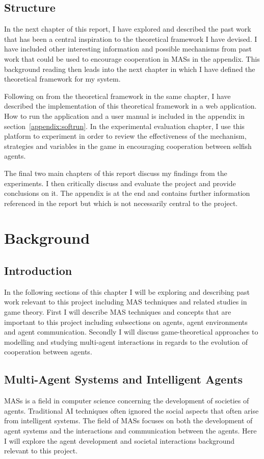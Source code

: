 \documentclass[]{final_report}
\begin{document}
\section{Structure}
In the next chapter of this report, I have explored and described the past work that has been a central inspiration to the theoretical framework I have devised. I have included other interesting information and possible mechanisms from past work that could be used to encourage cooperation in MASs in the appendix. This background reading then leads into the next chapter in which I have defined the theoretical framework for my system.\par
Following on from the theoretical framework in the same chapter, I have described the implementation of this theoretical framework in a web application. How to run the application and a user manual is included in the appendix in section~\ref{appendix:softrun}. In the experimental evaluation chapter, I use this platform to experiment in order to review the effectiveness of the mechanism, strategies and variables in the game in encouraging cooperation between selfish agents.\par
The final two main chapters of this report discuss my findings from the experiments. I then critically discuss and evaluate the project and provide conclusions on it. The appendix is at the end and contains further information referenced in the report but which is not necessarily central to the project.

\chapter{Background}

\section{Introduction}
In the following sections of this chapter I will be exploring and describing past work relevant to this project including MAS techniques and related studies in game theory. First I will describe MAS techniques and concepts that are important to this project including subsections on agents, agent environments and agent communication. Secondly I will discuss game-theoretical approaches to modelling and studying multi-agent interactions in regards to the evolution of cooperation between agents.

\section{Multi-Agent Systems and Intelligent Agents}
\label{sec:backgroundmas}
MASs is a field in computer science concerning the development of societies of agents. Traditional AI techniques often ignored the social aspects that often arise from intelligent systems. The field of MASs focuses on both the development of agent systems and the interactions and communication between the agents. Here I will explore the agent development and societal interactions background relevant to this project.
\end{document}
